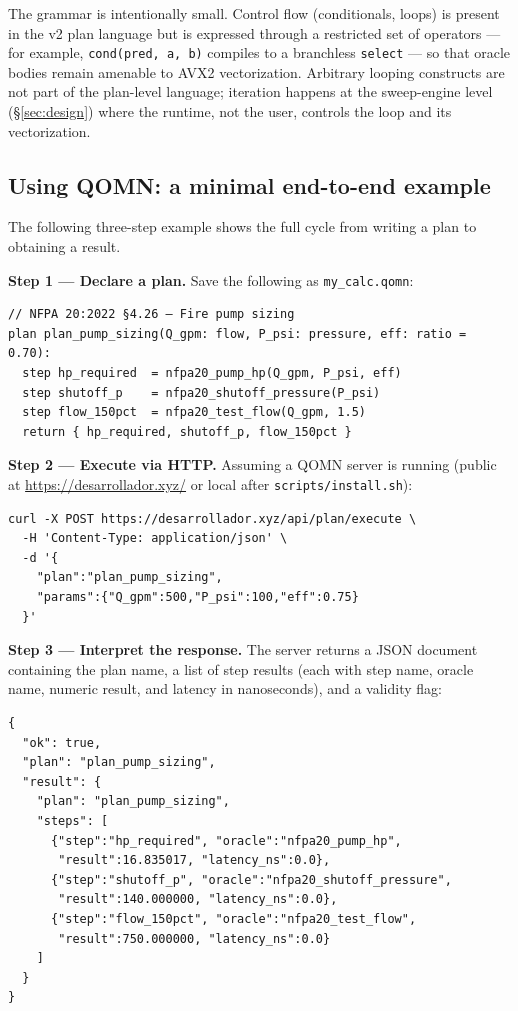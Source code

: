 \documentclass[11pt,a4paper]{article}
\begin{document}
The grammar is intentionally small. Control flow (conditionals, loops) is present in the v2 plan language but is expressed through a restricted set of operators --- for example, \texttt{cond(pred, a, b)} compiles to a branchless \texttt{select} --- so that oracle bodies remain amenable to AVX2 vectorization. Arbitrary looping constructs are not part of the plan-level language; iteration happens at the sweep-engine level (\S\ref{sec:design}) where the runtime, not the user, controls the loop and its vectorization.

\subsection{Using QOMN: a minimal end-to-end example}
\label{sec:howto}

The following three-step example shows the full cycle from writing a plan to obtaining a result.

\textbf{Step 1 --- Declare a plan.} Save the following as \texttt{my\_calc.qomn}:

\begin{lstlisting}
// NFPA 20:2022 §4.26 — Fire pump sizing
plan plan_pump_sizing(Q_gpm: flow, P_psi: pressure, eff: ratio = 0.70):
  step hp_required  = nfpa20_pump_hp(Q_gpm, P_psi, eff)
  step shutoff_p    = nfpa20_shutoff_pressure(P_psi)
  step flow_150pct  = nfpa20_test_flow(Q_gpm, 1.5)
  return { hp_required, shutoff_p, flow_150pct }
\end{lstlisting}

\textbf{Step 2 --- Execute via HTTP.} Assuming a QOMN server is running (public at \url{https://desarrollador.xyz/} or local after \texttt{scripts/install.sh}):

\begin{lstlisting}
curl -X POST https://desarrollador.xyz/api/plan/execute \
  -H 'Content-Type: application/json' \
  -d '{
    "plan":"plan_pump_sizing",
    "params":{"Q_gpm":500,"P_psi":100,"eff":0.75}
  }'
\end{lstlisting}

\textbf{Step 3 --- Interpret the response.} The server returns a JSON document containing the plan name, a list of step results (each with step name, oracle name, numeric result, and latency in nanoseconds), and a validity flag:

\begin{lstlisting}
{
  "ok": true,
  "plan": "plan_pump_sizing",
  "result": {
    "plan": "plan_pump_sizing",
    "steps": [
      {"step":"hp_required", "oracle":"nfpa20_pump_hp",
       "result":16.835017, "latency_ns":0.0},
      {"step":"shutoff_p", "oracle":"nfpa20_shutoff_pressure",
       "result":140.000000, "latency_ns":0.0},
      {"step":"flow_150pct", "oracle":"nfpa20_test_flow",
       "result":750.000000, "latency_ns":0.0}
    ]
  }
}
\end{lstlisting}
\end{document}
